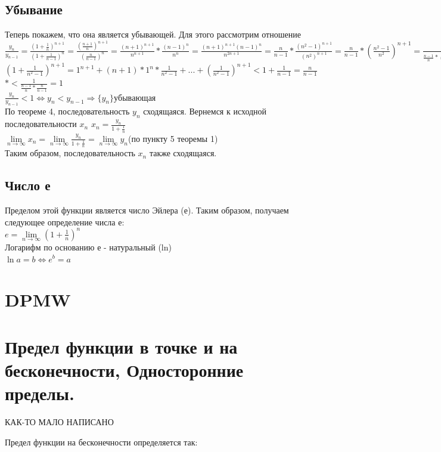\documentclass[oneside]{book}
\begin{document}
\begin{enumerate}
\section{Убывание}
Теперь покажем, что она является убывающей. Для этого рассмотрим отношение
$\frac{y_n}{y_{n-1}}=\frac{(1+\frac{1}{n})^{n+1}}{(1+\frac{1}{n-1})^n}=\frac{(\frac{n+1}{n})^{n+1}}{(\frac{n}{n-1})^n}=\frac{(n+1)^{n+1}}{n^{n+1}}*\frac{(n-1)^n}{n^n}=\frac{(n+1)^{n+1}(n-1)^{n}}{n^{2n+1}}=\frac{n}{n-1}*\frac{(n^2-1)^{n+1}}{(n^2)^{n+1}}=\frac{n}{n-1}*(\frac{n^2-1}{n^2})^{n+1}=\frac{1}{\frac{n-1}{n}*(1+\frac{1}{n^2-1})^{n+1}}=(*)$\\
$(1+\frac{1}{n^2-1})^{n+1}=1^{n+1}+(n+1)*1^n*\frac{1}{n^2-1}+...+(\frac{1}{n^2-1})^{n+1}<1+\frac{1}{n-1}=\frac{n}{n-1}$\\
$*<\frac{1}{\frac{n-1}{n}*\frac{n}{n-1}}=1$
\\$\frac{y_n}{y_{n-1}}<1\Leftrightarrow y_n<y_{n-1} \Rightarrow \{y_n\} убывающая$
\\По теореме 4, последовательность $y_n$ сходящаяся. Вернемся к исходной последовательности $x_n$
$x_n=\frac{y_n}{1+\frac{1}{n}}$\\
$\lim \limits_{n\rightarrow \infty}x_n=\lim \limits_{n\rightarrow \infty}\frac{y_n}{1+\frac{1}{n}}=\lim \limits_{n\rightarrow \infty}y_n$(по пункту 5 теоремы 1)\\
Таким образом, последовательность $x_n$ также сходящаяся.
\section{Число е}
Пределом этой функции является число Эйлера (е).
Таким образом, получаем следующее определение числа е:\\
$e=\lim \limits_{n\rightarrow \infty}(1+\frac{1}{n})^n$
\\Логарифм по основанию е - натуральный (ln)\\
$\ln a = b \Leftrightarrow e^b=a$
\chapter{DPMW}
\pagebreak

\chapter{Предел функции в точке и на бесконечности, Односторонние пределы.}

{\LARGE КАК-ТО МАЛО НАПИСАНО}

Предел функции на бесконечности определяется так:

\end{enumerate}
\end{document}
